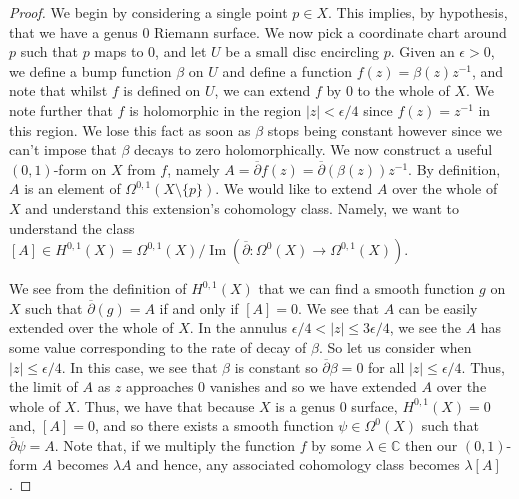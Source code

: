 \documentclass[11pt]{report}
\theoremstyle{definition}
\DeclareMathOperator{\im}{Im}
\begin{document}
\begin{proof}
  We begin by considering a single point $p \in X$. This implies, by hypothesis, that we have a genus $0$ Riemann surface. We now pick a coordinate chart around $p$ such that $p$ maps to $0$, and let $U$ be a small disc encircling $p$. Given an $\epsilon > 0$, we define a bump function $\beta$ on $U$ and define a function $f(z) = \beta(z)z^{-1}$, and note that whilst $f$ is defined on $U$, we can extend $f$ by $0$ to the whole of $X$. We note further that $f$ is holomorphic in the region $|z| < \epsilon/4$ since $f(z) = z^{-1}$ in this region. We lose this fact as soon as $\beta$ stops being constant however since we can't impose that $\beta$ decays to zero holomorphically. We now construct a useful $(0,1)$-form on $X$ from $f$, namely $A=\overline{\partial}f(z) = \overline{\partial}(\beta(z))z^{-1}$.
  By definition, $A$ is an element of $\Omega^{0,1}(X\setminus \{p\})$. We would like to extend $A$ over the whole of $X$ and understand this extension's cohomology class. Namely, we want to understand the class $[A] \in H^{0,1}(X)=\Omega^{0,1}(X)/\im(\overline{\partial}:\Omega^0(X) \rightarrow \Omega^{0,1}(X))$.

  We see from the definition of $H^{0,1}(X)$ that we can find a smooth function $g$ on $X$ such that $\overline{\partial}(g) = A$ if and only if $[A] = 0$.  We see that $A$ can be easily extended over the whole of $X$. In the annulus $\epsilon /4 < |z| \leq 3\epsilon /4$, we see the $A$ has some value corresponding to the rate of decay of $\beta$. So let us consider when $|z| \leq \epsilon /4$. In this case, we see that $\beta$ is constant so $\overline{\partial}\beta = 0$ for all $|z| \leq \epsilon /4$. Thus, the limit of $A$ as $z$ approaches $0$ vanishes and so we have extended $A$ over the whole of $X$. Thus, we have that because $X$ is a genus $0$ surface, $H^{0,1}(X)=0$ and, $[A] = 0$, and so there exists a smooth function $\psi \in \Omega^0(X)$ such that $\overline{\partial}\psi = A$. Note that, if we multiply the function $f$ by some $\lambda \in \mathbb{C}$ then our $(0,1)$-form $A$ becomes $\lambda A$ and hence, any associated cohomology class becomes $\lambda[A]$.


\end{proof}
\end{document}
